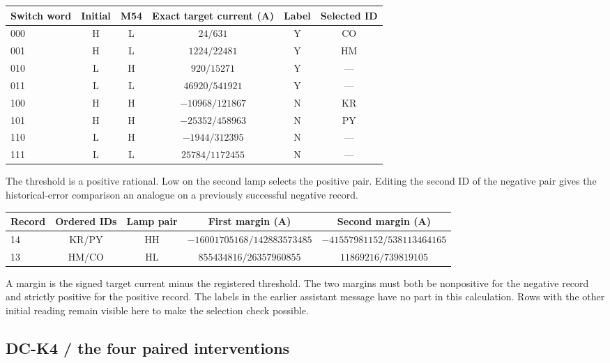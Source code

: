 \documentclass[12pt,letterpaper]{article}
\begin{document}
\begin{center}\small\begin{tabular}{@{}lccccc@{}}\toprule
Switch word & Initial & M54 & Exact target current (A) & Label & Selected ID\\\midrule
000 & H & L & $24/631$ & Y & CO\\
001 & H & L & $1224/22481$ & Y & HM\\
010 & L & H & $920/15271$ & Y & ---\\
011 & L & L & $46920/541921$ & Y & ---\\
100 & H & H & $-10968/121867$ & N & KR\\
101 & H & H & $-25352/458963$ & N & PY\\
110 & L & H & $-1944/312395$ & N & ---\\
111 & L & L & $25784/1172455$ & N & ---\\\bottomrule\end{tabular}\end{center}

The threshold is a positive rational. Low on the second lamp selects the positive pair. Editing the second ID of the negative pair gives the historical-error comparison an analogue on a previously successful negative record.

\begin{center}\small\begin{tabular}{@{}lcccc@{}}\toprule
Record & Ordered IDs & Lamp pair & First margin (A) & Second margin (A)\\\midrule
14 & KR/PY & HH & $-16001705168/142883573485$ & $-41557981152/538113464165$\\
13 & HM/CO & HL & $855434816/26357960855$ & $11869216/739819105$\\\bottomrule\end{tabular}\end{center}

A margin is the signed target current minus the registered threshold. The two margins must both be nonpositive for the negative record and strictly positive for the positive record. The labels in the earlier assistant message have no part in this calculation. Rows with the other initial reading remain visible here to make the selection check possible.

\clearpage\subsection{DC-K4 / the four paired interventions}
\end{document}
